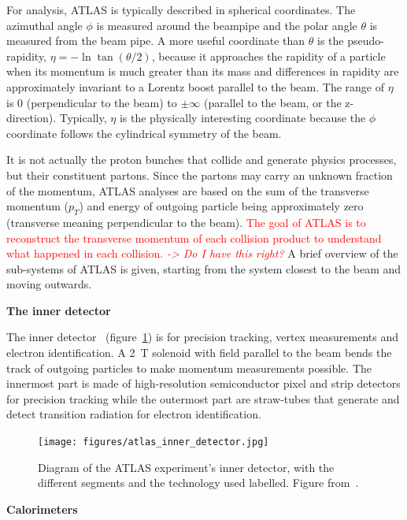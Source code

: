 For analysis, ATLAS is typically described in spherical coordinates. The azimuthal angle $\phi$ is measured around the beampipe and the polar angle $\theta$ is measured from the beam pipe. A more useful coordinate than $\theta$ is the pseudo-rapidity, $\eta = -\ln\tan\left(\theta/2\right)$, because it approaches the rapidity of a particle when its momentum is much greater than its mass and differences in rapidity are approximately invariant to a Lorentz boost parallel to the beam. The range of $\eta$ is 0 (perpendicular to the beam) to $\pm\infty$ (parallel to the beam, or the z-direction). Typically, $\eta$ is the physically interesting coordinate because the $\phi$ coordinate follows the cylindrical symmetry of the beam.

It is not actually the proton bunches that collide and generate physics processes, but their constituent partons. Since the partons may carry an unknown fraction of the momentum, ATLAS analyses are based on the sum of the transverse momentum ($p_T$) and energy of outgoing particle being approximately zero (transverse meaning perpendicular to the beam). \textcolor{red}{The goal of ATLAS is to reconstruct the transverse momentum of each collision product to understand what happened in each collision. \textit{-> Do I have this right?}} A brief overview of the sub-systems of ATLAS is given, starting from the system closest to the beam and moving outwards. 

\textbf{The inner detector}

The inner detector~\cite{atlas_inner_detector_tdr_1, atlas_inner_detector_tdr_2} (figure~\ref{fig:atlas_inner_detector}) is for precision tracking, vertex measurements and electron identification. A \SI{2}{\tesla} solenoid with field parallel to the beam bends the track of outgoing particles to make momentum measurements possible. The innermost part is made of high-resolution semiconductor pixel and strip detectors for precision tracking while the outermost part are straw-tubes that generate and detect transition radiation for electron identification.

\begin{figure}
    \centering
    \texttt{[image: figures/atlas\_inner\_detector.jpg]}
    \caption{Diagram of the ATLAS experiment's inner detector, with the different segments and the technology used labelled. Figure from~\cite{collaboration_atlas_2008}.}
    \label{fig:atlas_inner_detector}
\end{figure}

\textbf{Calorimeters}

